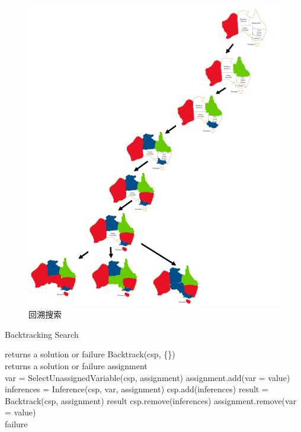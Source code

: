 \begin{figure}[H]
    \centering
    \includegraphics[scale=0.8]{img/Chapter2/2-3/1.png}
    \caption{回溯搜索}
\end{figure}

\begin{algorithm}[H]
    \caption{Backtracking Search}
    \begin{algorithmic}[1]
         returns a solution or failure
        \State \Return Backtrack(csp, \{\})
        \EndProcedure
        \\
         returns a solution or failure
        \State \Return assignment
        \EndIf
        \\
        \State var = SelectUnassignedVariable(csp, assignment)
        \State assignment.add({var = value})
        \State inferences = Inference(csp, var, assignment)
        \State csp.add(inferences)
        \State result = Backtrack(csp, assignment)
        \State \Return result
        \EndIf
        \State csp.remove(inferences)
        \EndIf
        \State assignment.remove({var = value})
        \EndIf
        \EndFor
        \\
        \State \Return failure
        \EndProcedure
    \end{algorithmic}
\end{algorithm}

